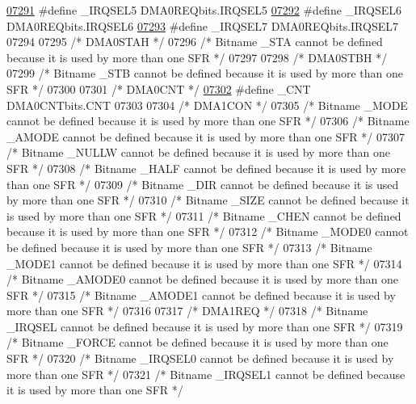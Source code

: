 \begin{DoxyCode}
\hypertarget{a00015_source_l07291}{}\hyperlink{a00015_a8c944748720e61cfd5e7398fb71ff632}{07291} \textcolor{preprocessor}{#define \_IRQSEL5 DMA0REQbits.IRQSEL5}
\hypertarget{a00015_source_l07292}{}\hyperlink{a00015_a97558d374c6fd8241a2b51ad466d851e}{07292} \textcolor{preprocessor}{#define \_IRQSEL6 DMA0REQbits.IRQSEL6}
\hypertarget{a00015_source_l07293}{}\hyperlink{a00015_a5848cebe8fe613ebc3105f2fc4691dee}{07293} \textcolor{preprocessor}{#define \_IRQSEL7 DMA0REQbits.IRQSEL7}
07294 
07295 \textcolor{comment}{/* DMA0STAH */}
07296 \textcolor{comment}{/* Bitname \_STA cannot be defined because it is used by more than one SFR */}
07297 
07298 \textcolor{comment}{/* DMA0STBH */}
07299 \textcolor{comment}{/* Bitname \_STB cannot be defined because it is used by more than one SFR */}
07300 
07301 \textcolor{comment}{/* DMA0CNT */}
\hypertarget{a00015_source_l07302}{}\hyperlink{a00015_a562136de9a0d6048a03513698ff49cfc}{07302} \textcolor{preprocessor}{#define \_CNT DMA0CNTbits.CNT}
07303 
07304 \textcolor{comment}{/* DMA1CON */}
07305 \textcolor{comment}{/* Bitname \_MODE cannot be defined because it is used by more than one SFR */}
07306 \textcolor{comment}{/* Bitname \_AMODE cannot be defined because it is used by more than one SFR */}
07307 \textcolor{comment}{/* Bitname \_NULLW cannot be defined because it is used by more than one SFR */}
07308 \textcolor{comment}{/* Bitname \_HALF cannot be defined because it is used by more than one SFR */}
07309 \textcolor{comment}{/* Bitname \_DIR cannot be defined because it is used by more than one SFR */}
07310 \textcolor{comment}{/* Bitname \_SIZE cannot be defined because it is used by more than one SFR */}
07311 \textcolor{comment}{/* Bitname \_CHEN cannot be defined because it is used by more than one SFR */}
07312 \textcolor{comment}{/* Bitname \_MODE0 cannot be defined because it is used by more than one SFR */}
07313 \textcolor{comment}{/* Bitname \_MODE1 cannot be defined because it is used by more than one SFR */}
07314 \textcolor{comment}{/* Bitname \_AMODE0 cannot be defined because it is used by more than one SFR */}
07315 \textcolor{comment}{/* Bitname \_AMODE1 cannot be defined because it is used by more than one SFR */}
07316 
07317 \textcolor{comment}{/* DMA1REQ */}
07318 \textcolor{comment}{/* Bitname \_IRQSEL cannot be defined because it is used by more than one SFR */}
07319 \textcolor{comment}{/* Bitname \_FORCE cannot be defined because it is used by more than one SFR */}
07320 \textcolor{comment}{/* Bitname \_IRQSEL0 cannot be defined because it is used by more than one SFR */}
07321 \textcolor{comment}{/* Bitname \_IRQSEL1 cannot be defined because it is used by more than one SFR */}

\end{DoxyCode}
